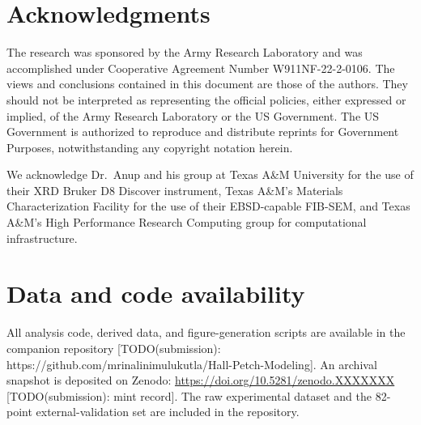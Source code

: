\documentclass[5p,times,twocolumn]{elsarticle}
\begin{document}
\section*{Acknowledgments}

The research was sponsored by the Army Research Laboratory and was accomplished under Cooperative Agreement Number W911NF-22-2-0106. The views and conclusions contained in this document are those of the authors. They should not be interpreted as representing the official policies, either expressed or implied, of the Army Research Laboratory or the US Government. The US Government is authorized to reproduce and distribute reprints for Government Purposes, notwithstanding any copyright notation herein. 

We acknowledge Dr.\ Anup and his group at Texas A\&M University for the use of their XRD Bruker D8 Discover instrument, Texas A\&M's Materials Characterization Facility for the use of their EBSD-capable FIB-SEM, and Texas A\&M's High Performance Research Computing group for computational infrastructure.

\section*{Data and code availability}

All analysis code, derived data, and figure-generation scripts are available in the companion repository [TODO(submission): https://github.com/mrinalinimulukutla/Hall-Petch-Modeling]. An archival snapshot is deposited on Zenodo: \url{https://doi.org/10.5281/zenodo.XXXXXXX} [TODO(submission): mint record]. The raw experimental dataset and the 82-point external-validation set are included in the repository.





\end{document}
